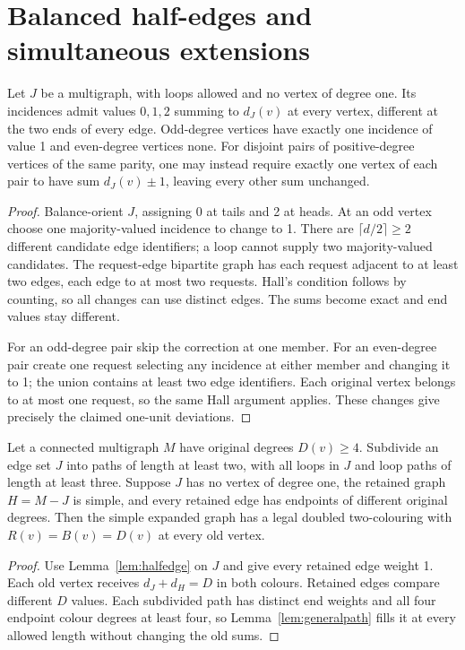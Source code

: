 \section{Balanced half-edges and simultaneous extensions}\label{sec:balanced}

\begin{lemma}\label{lem:halfedge}
Let $J$ be a multigraph, with loops allowed and no vertex of degree
one. Its incidences admit values $0,1,2$ summing to $d_J(v)$ at every
vertex, different at the two ends of every edge. Odd-degree vertices
have exactly one incidence of value 1 and even-degree vertices none.
For disjoint pairs of positive-degree vertices of the same parity,
one may instead require exactly one vertex of each pair to have sum
$d_J(v)\pm1$, leaving every other sum unchanged.
\end{lemma}
\begin{proof}
Balance-orient $J$, assigning 0 at tails and 2 at heads. At an odd
vertex choose one majority-valued incidence to change to 1. There
are $\lceil d/2\rceil\ge2$ different candidate edge identifiers;
a loop cannot supply two majority-valued candidates. The request-edge
bipartite graph has each request adjacent to at least two edges, each
edge to at most two requests. Hall's condition follows by counting,
so all changes can use distinct edges. The sums become exact and
end values stay different.

For an odd-degree pair skip the correction at one member. For an
even-degree pair create one request selecting any incidence at either
member and changing it to 1; the union contains at least two edge
identifiers. Each original vertex belongs to at most one request,
so the same Hall argument applies. These changes give precisely the
claimed one-unit deviations.
\end{proof}

\begin{theorem}[A4]\label{thm:partialbalanced}
Let a connected multigraph $M$ have original degrees $D(v)\ge4$.
Subdivide an edge set $J$ into paths of length at least two, with all
loops in $J$ and loop paths of length at least three. Suppose $J$ has
no vertex of degree one, the retained graph $H=M-J$ is simple, and
every retained edge has endpoints of different original degrees.
Then the simple expanded graph has a legal doubled two-colouring
with $R(v)=B(v)=D(v)$ at every old vertex.
\end{theorem}
\begin{proof}
Use Lemma~\ref{lem:halfedge} on $J$ and give every retained edge
weight 1. Each old vertex receives $d_J+d_H=D$ in both colours.
Retained edges compare different $D$ values. Each subdivided path
has distinct end weights and all four endpoint colour degrees at
least four, so Lemma~\ref{lem:generalpath} fills it at every allowed
length without changing the old sums.
\end{proof}

